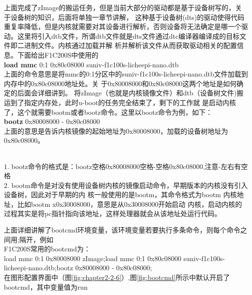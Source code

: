 上面完成了zImage的搬运任务，但是当前大部分的驱动都是基于设备树写的，关于设备树的知识，后面将单独一章节讲解，
这种基于设备树(dts)的驱动使得代码重复率降低，但是内核就需要对其设备进行解析，否则设备将无法确定是哪一个驱
动。这里将引入dtb文件，所谓dtb文件就是dts文件通过dtc编译器编译成的目标文件即二进制文件。内核通过加载并解
析并解析该文件从而获取驱动相关的配置信息。下面给出F1C200S中使用的\\
\textbf{load mmc} 0:1 0x80c08000 suniv-f1c100s-licheepi-nano.dtb \\
上面的命令意思是将mmc的0:1分区中的suniv-f1c100s-licheepi-nano.dtb文件加载到内存中的0x80c08000地址处。关
于0x80008000和0x80c08000这两个地址是如何确定的后面会详细讲到。
将zImage（也就是内核镜像文件）和dtb（设备树文件)搬运到了指定内存处，此时u-boot的任务完全结束了，剩下的工作就
是启动内核了，这个就需要bootm或者bootz命令。这里以bootz命令为例，如下：\\
\textbf{bootz} 0x80008000 - 0x80c08000 \\
上面的意思是告诉内核镜像的起始地址为0x80008000，加载的设备树地址为0x80c08000。
\begin{tcolorbox}[colback=red!5!white,colframe=red!75!black]
	\faWarning \  \\
	$1.$  bootz命令的格式是：bootz空格0x80008000空格-空格0x80c08000,注意-左右有空格\\
	$2.$  bootm命令是对没有使用设备树内核的镜像启动命令，早期版本的内核没有引入设备树，因此对于早期的内
	核一般使用的是bootm，其命令格式为bootm 内核地址，比如bootm x0x30008000，意思是从0x30008000开始启动
	内核，启动内核的过程其实是将pc指针指向该地址，这样处理器就会从该地址处运行代码。
\end{tcolorbox}
上面详细讲解了bootcmd环境变量，该环境变量若要执行多条命令，则每个命令之间用;隔开，例如\\
F1C200S常用的bootcmd为：\\
load mmc 0:1 0x80008000 zImage;load mmc 0:1 0x80c08000 suniv-f1c100s-licheepi-nano.dtb;bootz 
0x80008000 - 0x80c08000;\\
在图形配置界面中（图\ref{fig:chapter2-2-6}）,图\ref{fig:bootcmd}所示中默认开启了bootcmd，其中变量值为run
 
